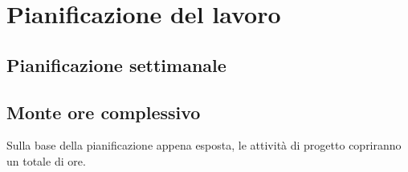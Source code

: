 
\section{Pianificazione del lavoro}

\subsection{Pianificazione settimanale}
	\prospettoSettimanale
	
\subsection{Monte ore complessivo}
	Sulla base della pianificazione appena esposta, le attività di progetto copriranno un totale di \textbf{\totaleOre} ore.
%	    
